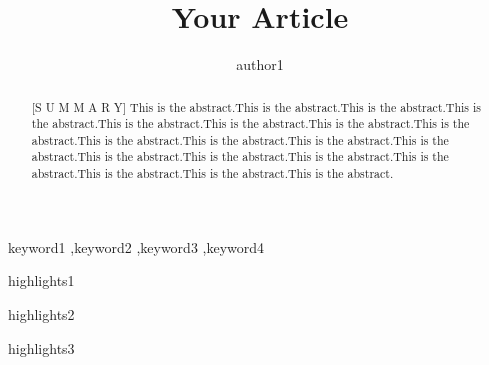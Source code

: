 \documentclass[a4paper,fleqn]{cas-dc}
\begin{document}
\let\WriteBookmarks\relax
\def\floatpagepagefraction{1}
\def\textpagefraction{.001}


\title[mode = title]{Your Article}

\tnotemark[1]


\author[1]{author1}

\address[1]{ADDRESS1}

\begin{comment}
\author[2,3]{author2}
\address[2]{Sayahna Foundation, Jagathy, Trivandrum 695014, India}
\address[3]{South China University of Technology, Guangzhou 510000, China}
\cormark[cor1] 

\cortext[cor1]{Corresponding author:***} 
\end{comment}

\begin{abstract}[S U M M A R Y]
This is the abstract.This is the abstract.This is the abstract.This is the abstract.This is the abstract.This is the abstract.This is the abstract.This is the abstract.This is the abstract.This is the abstract.This is the abstract.This is the abstract.This is the abstract.This is the abstract.This is the abstract.This is the abstract.This is the abstract.This is the abstract.This is the abstract.
\end{abstract}
\begin{keywords}
	keyword1 \sep keyword2 \sep keyword3 \sep keyword4
\end{keywords}


\begin{highlights}
	\item highlights1
	
	\item highlights2
		
	\item highlights3
\end{highlights}

\maketitle








\end{document}
